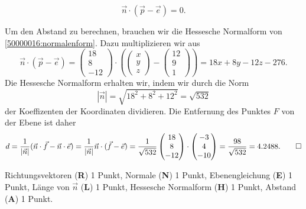 \begin{loesung}
\begin{teilaufgaben}
\begin{equation}
\vec{n}\cdot (\vec{p}-\vec{e})=0.
\label{50000016:normalenform}
\end{equation}
\item
Um den Abstand zu berechnen, brauchen wir die Hessesche Normalform
von \eqref{50000016:normalenform}.
Dazu multiplizieren wir aus
\[
\vec{n}\cdot (\vec{p}-\vec{e})
=
\begin{pmatrix} 18\\8\\-12 \end{pmatrix}
\cdot\left(
\begin{pmatrix}x\\y\\z\end{pmatrix}
-
\begin{pmatrix}12\\9\\1\end{pmatrix}
\right)
=
18x+8y-12z-276.
\]
Die Hessesche Normalform erhalten wir, indem wir durch die Norm
\[
|\vec{n}|
=
\sqrt{18^2+8^2+12^2}
=
\sqrt{532}
\]
der Koeffizenten der Koordinaten dividieren.
Die Entfernung des Punktes $F$ von der Ebene ist daher
\[
d
=
\frac{1}{|\vec{n}|}
(\vec{n}\cdot\vec{f}-\vec{n}\cdot\vec{e})
=
\frac{1}{|\vec{n}|}
\vec{n}\cdot(\vec{f}-\vec{e})
=
\frac1{\sqrt{532}}
\begin{pmatrix}18\\8\\-12\end{pmatrix}
\cdot
\begin{pmatrix}-3\\4\\-10\end{pmatrix}
=
\frac{98}{\sqrt{532}}
=
4.2488.
\qedhere
\]
\end{teilaufgaben}
\end{loesung}

\begin{bewertung}
Richtungsvektoren ({\bf R}) 1 Punkt,
Normale ({\bf N}) 1 Punkt,
Ebenengleichung ({\bf E}) 1 Punkt,
Länge von $\vec{n}$ ({\bf L}) 1 Punkt,
Hessesche Normalform ({\bf H}) 1 Punkt,
Abstand ({\bf A}) 1 Punkt.
\end{bewertung}


